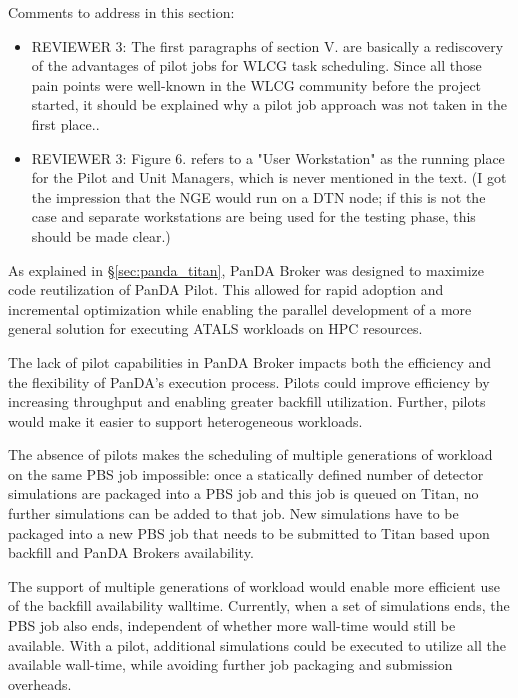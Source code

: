 \ifreview
Comments to address in this section:
\begin{itemize}
	\color{red} 
	\item REVIEWER 3: The first paragraphs of section V. are basically a
	rediscovery of the advantages of pilot jobs for WLCG task scheduling.
	Since all those pain points were well-known in the WLCG community before
	the project started, it should be explained why a pilot job approach was
	not taken in the first place..
	\item REVIEWER 3: Figure 6. refers to a "User Workstation" as the running
	place for the Pilot and Unit Managers, which is never mentioned in the
	text. (I got the impression that the NGE would run on a DTN node; if this
	is not the case and separate workstations are being used for the testing
	phase, this should be made clear.)
\end{itemize}
\fi

As explained in \S\ref{sec:panda_titan}, PanDA Broker was designed to
maximize code reutilization of PanDA Pilot. This allowed for rapid adoption
and incremental optimization while enabling the parallel development of a
more general solution for executing ATALS workloads on HPC resources.

The lack of pilot capabilities in PanDA Broker impacts both the efficiency
and the flexibility of PanDA's execution process. Pilots could improve
efficiency by increasing throughput and enabling greater backfill
utilization. Further, pilots would make it easier to support heterogeneous
workloads.

The absence of pilots makes the scheduling of multiple generations of
workload on the same PBS job impossible: once a statically defined number of
detector simulations are packaged into a PBS job and this job is queued on
Titan, no further simulations can be added to that job. New simulations have
to be packaged into a new PBS job that needs to be submitted to Titan based
upon backfill and PanDA Brokers availability.

The support of multiple generations of workload would enable more efficient
use of the backfill availability walltime. Currently, when a set of
simulations ends, the PBS job also ends, independent of whether more
wall-time would still be available. With a pilot, additional simulations
could be executed to utilize all the available wall-time, while avoiding
further job packaging and submission overheads.


